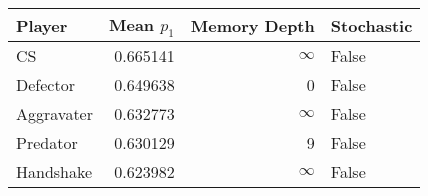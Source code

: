 \begin{tabular}{lrrl}
\toprule
     Player &  Mean $p_1$ &  Memory Depth & Stochastic \\
\midrule
         CS &    0.665141 &            \(\infty\) &      False \\
   Defector &    0.649638 &             0 &      False \\
 Aggravater &    0.632773 &            \(\infty\) &      False \\
   Predator &    0.630129 &             9 &      False \\
  Handshake &    0.623982 &            \(\infty\) &      False \\
\bottomrule
\end{tabular}
